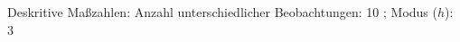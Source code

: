 				\label{tableValues:afec021h_g3}
				\vspace*{-\baselineskip}
                    \begin{noten}
                	    \note{} Deskritive Maßzahlen:
                	    Anzahl unterschiedlicher Beobachtungen: 10%
                	    ; 
                	      Modus ($h$): 3
                     \end{noten}


